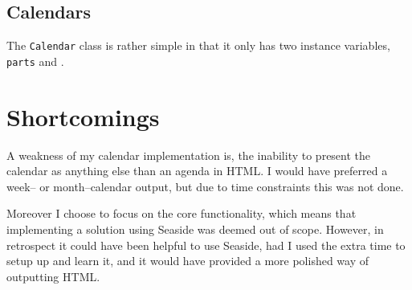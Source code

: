 \subsection{Calendars}
The \texttt{Calendar} class is rather simple in that it only has two instance variables, \texttt{parts} and .

\section{Shortcomings}
A weakness of my calendar implementation is, the inability to present the calendar as anything else than an agenda in HTML.
I would have preferred a week-- or month--calendar output, but due to time constraints this was not done.

Moreover I choose to focus on the core functionality, which means that implementing a solution using Seaside was deemed out of scope.
However, in retrospect it could have been helpful to use Seaside, had I used the extra time to setup up and learn it, and it would have provided a more polished way of outputting HTML.



